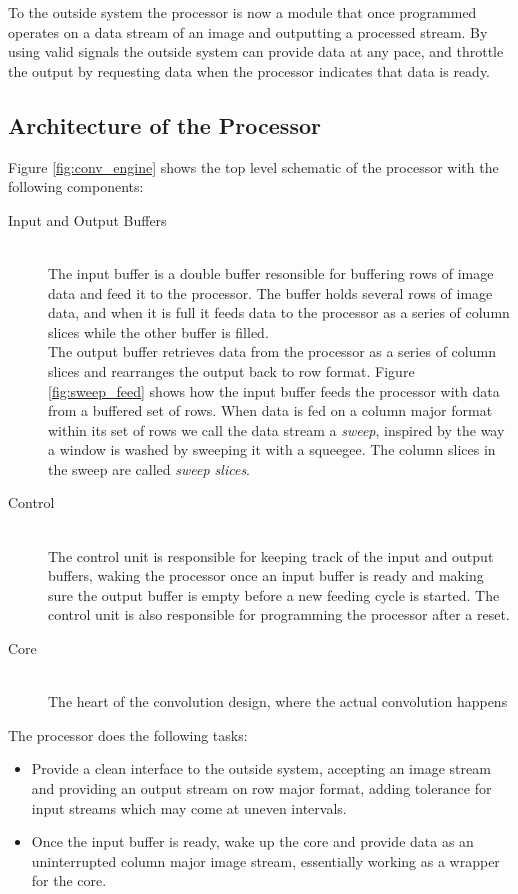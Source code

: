 To the outside system the processor is now a module that once programmed operates on a data stream of an image and outputting a processed stream. 
By using valid signals the outside system can provide data at any pace, and throttle the output by requesting data when the processor indicates that data is ready. 

\subsection{Architecture of the Processor}

Figure \ref{fig:conv_engine} shows the top level schematic of the processor with the following components:

\begin{description}
    \item[Input and Output Buffers] \hfill\\
        The input buffer is a double buffer resonsible for buffering rows of image data and feed it to the processor.
        The buffer holds several rows of image data, and when it is full it feeds data to the processor as a series of column slices while the other buffer is filled.\\
        The output buffer retrieves data from the processor as a series of column slices and rearranges the output back to row format.
        Figure \ref{fig:sweep_feed} shows how the input buffer feeds the processor with data from a buffered set of rows.
        When data is fed on a column major format within its set of rows we call the data stream a \textit{sweep}, inspired by the way a window is washed by sweeping it with a squeegee.
        The column slices in the sweep are called \textit{sweep slices}.
    \item[Control] \hfill\\
        The control unit is responsible for keeping track of the input and output buffers, waking the processor once an input buffer is ready and making sure the output buffer is empty before a new feeding cycle is started.
        The control unit is also responsible for programming the processor after a reset.
    \item[Core] \hfill\\
        The heart of the convolution design, where the actual convolution happens
\end{description}

The processor does the following tasks:
\begin{itemize}
    \item Provide a clean interface to the outside system, accepting an image stream and providing an output stream on row major format, adding tolerance for input streams which may come at uneven intervals. 
    \item Once the input buffer is ready, wake up the core and provide data as an uninterrupted column major image stream, essentially working as a wrapper for the core.
\end{itemize}

